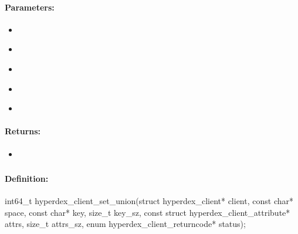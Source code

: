 \paragraph{Parameters:}
\begin{itemize}[noitemsep]
\item {}\\

\item {}\\

\item {}\\

\item {}\\

\item {}\\

\end{itemize}

\paragraph{Returns:}
\begin{itemize}[noitemsep]
\item {}\\

\end{itemize}

\pagebreak
\subsubsection{}
\label{api:c:set_union}


\paragraph{Definition:}
\begin{ccode}
int64_t hyperdex_client_set_union(struct hyperdex_client* client,
        const char* space,
        const char* key, size_t key_sz,
        const struct hyperdex_client_attribute* attrs, size_t attrs_sz,
        enum hyperdex_client_returncode* status);
\end{ccode}

